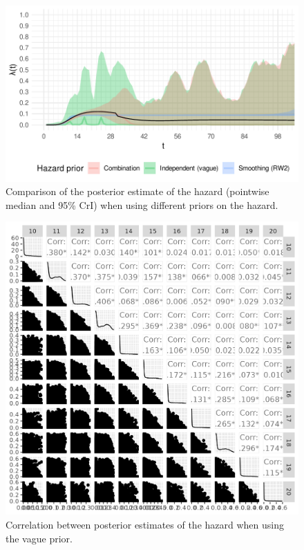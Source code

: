 \documentclass[thesis.tex]{subfiles}
\begin{document}
\begin{figure}
  \centering \includegraphics{cis-perfect-testing/hazard-results}
  \caption[Comparison of hazard estimates under different priors]{Comparison of the posterior estimate of the hazard (pointwise median and 95\% CrI) when using different priors on the hazard. \label{perf-test:fig:hazard-results}}
\end{figure}

\begin{figure}
  \centering \includegraphics{cis-perfect-testing/hazard-pairs-results}
  \caption[Correlation between hazard estimates]{Correlation between posterior estimates of the hazard when using the vague prior. \label{perf-test:fig:hazard-pairs-results}}
\end{figure}
\end{document}
